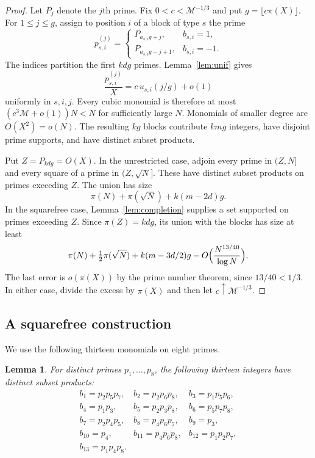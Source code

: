 \documentclass[11pt]{article}
\numberwithin{equation}{section}
\newtheorem{lemma}[theorem]{Lemma}
\theoremstyle{remark}
\begin{document}
\begin{proof}
Let $P_j$ denote the $j$th prime. Fix $0<c<\mathcal M^{-1/3}$ and put $g=\lfloor c\pi(X)\rfloor$. For $1\le j\le g$, assign to position $i$ of a block of type $s$ the prime
\[
p^{(j)}_{s,i}=\begin{cases}P_{a_{s,i}g+j},&b_{s,i}=1,\\ P_{a_{s,i}g-j+1},&b_{s,i}=-1.\end{cases}
\]
The indices partition the first $kdg$ primes. Lemma~\ref{lem:unif} gives
\[
\frac{p^{(j)}_{s,i}}X=c\,u_{s,i}(j/g)+o(1)
\]
uniformly in $s,i,j$. Every cubic monomial is therefore at most $(c^3\mathcal M+o(1))N<N$ for sufficiently large $N$. Monomials of smaller degree are $O(X^2)=o(N)$. The resulting $kg$ blocks contribute $kmg$ integers, have disjoint prime supports, and have distinct subset products.

Put $Z=P_{kdg}=O(X)$. In the unrestricted case, adjoin every prime in $(Z,N]$ and every square of a prime in $(Z,\sqrt N]$. These have distinct subset products on primes exceeding $Z$. The union has size
\[
\pi(N)+\pi(\sqrt N)+k(m-2d)g.
\]
In the squarefree case, Lemma~\ref{lem:completion} supplies a set supported on primes exceeding $Z$. Since $\pi(Z)=kdg$, its union with the blocks has size at least
\[
\pi(N)+\tfrac12\pi(\sqrt N)+k(m-3d/2)g-O\Bigl(\frac{N^{13/40}}{\log N}\Bigr).
\]
The last error is $o(\pi(X))$ by the prime number theorem, since $13/40<1/3$. In either case, divide the excess by $\pi(X)$ and then let $c\uparrow\mathcal M^{-1/3}$.
\end{proof}

\subsection{A squarefree construction}\label{sec:sfblock}
We use the following thirteen monomials on eight primes.

\begin{lemma}\label{lem:block13}
For distinct primes $p_1,\dots,p_8$, the following thirteen integers have distinct subset products:
\[
\begin{array}{lll}
b_1=p_2p_5p_7, & b_2=p_2p_6p_8, & b_3=p_1p_5p_6,\\
b_4=p_1p_3, & b_5=p_2p_3p_8, & b_6=p_5p_7p_8,\\
b_7=p_2p_4p_5, & b_8=p_4p_6p_7, & b_9=p_3,\\
b_{10}=p_4, & b_{11}=p_4p_6p_8, & b_{12}=p_1p_2p_7,\\
b_{13}=p_1p_4p_8. & &
\end{array}
\]
\end{lemma}
\end{document}
